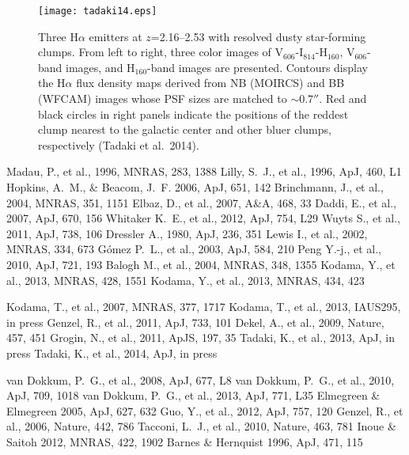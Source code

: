 \begin{figure}%
\centerline{
\texttt{[image: tadaki14.eps]}
}
\caption{
Three H$\alpha$ emitters at $z$=2.16--2.53 with resolved dusty star-forming clumps.
From left to right, three color images of V$_{606}$-I$_{814}$-H$_{160}$,
V$_{606}$-band images, and H$_{160}$-band images are presented.
Contours display the H$\alpha$ flux density maps derived from
NB (MOIRCS) and BB (WFCAM) images whose PSF sizes are matched to $\sim$0.7$''$.
Red and black circles in right panels indicate the positions of the reddest
clump nearest to the galactic center and other bluer clumps, respectively
(Tadaki et al.\ 2014).
}
\label{fig:}
\end{figure}



 Madau, P., et al., 1996, MNRAS, 283, 1388 
 Lilly, S.~J., et al., 1996, ApJ, 460, L1 
 Hopkins, A.~M., \& Beacom, J.~F. 2006, ApJ, 651, 142 
 Brinchmann, J., et al., 2004, MNRAS, 351, 1151 
 Elbaz, D., et al., 2007, A\&A, 468, 33 
 Daddi, E., et al., 2007, ApJ, 670, 156 
 Whitaker K.~E., et al., 2012, ApJ, 754, L29 
 Wuyts S., et al., 2011, ApJ, 738, 106 
 Dressler A., 1980, ApJ, 236, 351 
 Lewis I., et al., 2002, MNRAS, 334, 673 
 G{\'o}mez P.~L., et al., 2003, ApJ, 584, 210 
 Peng Y.-j., et al., 2010, ApJ, 721, 193 
 Balogh M., et al., 2004, MNRAS, 348, 1355 
 Kodama, Y., et al., 2013, MNRAS, 428, 1551
 Kodama, Y., et al., 2013, MNRAS, 434, 423

 Kodama, T., et al., 2007, MNRAS, 377, 1717
 Kodama, T., et al., 2013, IAUS295, in press
 Genzel, R., et al., 2011, ApJ, 733, 101
 Dekel, A., et al., 2009, Nature, 457, 451
 Grogin, N., et al., 2011, ApJS, 197, 35
 Tadaki, K., et al., 2013, ApJ, in press
 Tadaki, K., et al., 2014, ApJ, in press

 van Dokkum, P.~G., et al., 2008, ApJ, 677, L8
 van Dokkum, P.~G., et al., 2010, ApJ, 709, 1018
 van Dokkum, P.~G., et al., 2013, ApJ, 771, L35
 Elmegreen \& Elmegreen 2005, ApJ, 627, 632
 Guo, Y., et al.,  2012, ApJ, 757, 120
 Genzel, R., et al., 2006, Nature, 442, 786
 Tacconi, L.~J., et al., 2010, Nature, 463, 781
 Inoue \& Saitoh 2012, MNRAS, 422, 1902
 Barnes \& Hernquist 1996, ApJ, 471, 115

%
